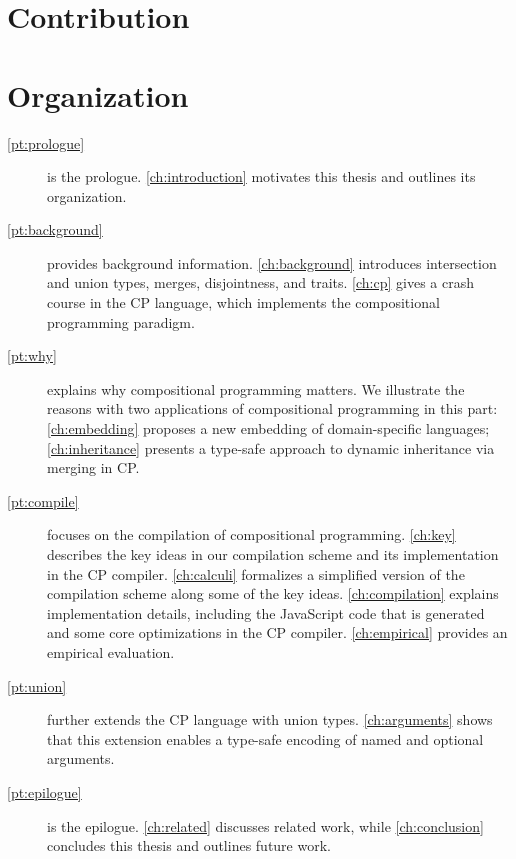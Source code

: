 \section{Contribution}

\section{Organization}

\begin{description}
\item[\autoref{pt:prologue}] is the prologue. \autoref{ch:introduction}
      motivates this thesis and outlines its organization.
\item[\autoref{pt:background}] provides background information.
      \autoref{ch:background} introduces intersection and union types, merges,
      disjointness, and traits. \autoref{ch:cp} gives a crash course in the CP
      language, which implements the compositional programming paradigm.
\item[\autoref{pt:why}] explains why compositional programming matters. We
      illustrate the reasons with two applications of compositional programming
      in this part: \autoref{ch:embedding} proposes a new embedding of
      domain-specific languages; \autoref{ch:inheritance} presents a type-safe
      approach to dynamic inheritance via merging in CP.
\item[\autoref{pt:compile}] focuses on the compilation of compositional
      programming. \autoref{ch:key} describes the key ideas in our compilation
      scheme and its implementation in the CP compiler. \autoref{ch:calculi}
      formalizes a simplified version of the compilation scheme along some of
      the key ideas. \autoref{ch:compilation} explains implementation details,
      including the JavaScript code that is generated and some core
      optimizations in the CP compiler. \autoref{ch:empirical} provides an
      empirical evaluation.
\item[\autoref{pt:union}] further extends the CP language with union types.
      \autoref{ch:arguments} shows that this extension enables a type-safe
      encoding of named and optional arguments.
\item[\autoref{pt:epilogue}] is the epilogue. \autoref{ch:related} discusses
      related work, while \autoref{ch:conclusion} concludes this thesis and
      outlines future work.
\end{description}

\noindent\hrulefill

